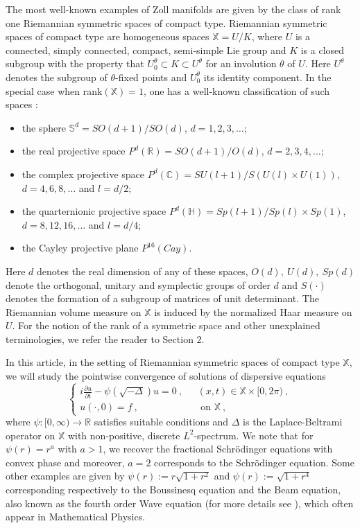 \documentclass[12pt]{amsart}
\theoremstyle{definition}
\newcommand{\R}{\mathbb R}%
\newcommand{\C}{\mathbb C}%
\newcommand{\Sb}{\mathbb S}%
\newcommand{\X}{\mathbb X}%
\newcommand{\Hb}{\mathbb H}%
\numberwithin{equation}{section}
\begin{document}
The most well-known examples of Zoll manifolds are given by the class of rank one Riemannian symmetric spaces of compact type. Riemannian symmetric spaces of compact type are homogeneous spaces $\X=U/K$, where $U$ is a connected, simply connected, compact, semi-simple Lie group and $K$ is a closed subgroup with the property that $U^\theta_0 \subset K \subset U^\theta$ for an involution $\theta$ of $U$. Here $U^\theta$ denotes the subgroup of $\theta$-fixed points and $U^\theta_0$ its identity component. In the special case when rank$(\X)=1$, one has a well-known classification of such spaces \cite{Wang}: 
\begin{itemize}
\item the sphere $\Sb^d =SO(d+1)/SO(d)$, $d=1,2,3,\dots$;
\item the real projective space $P^d(\R)=SO(d+1)/O(d)$, $d=2,3,4,\dots$;
\item the complex projective space $P^d(\C)=SU(l+1)/S(U(l) \times U(1))$, $d=4,6,8,\dots$ and $l=d/2$;
\item the quarternionic projective space $P^d(\Hb)=Sp(l+1)/Sp(l) \times Sp(1)$, $d=8,12,16,\dots$ and $l=d/4$;
\item the Cayley projective plane $P^{16}(Cay)$.
\end{itemize}
Here $d$ denotes the real dimension of any of these spaces, $O(d),\:U(d),\:Sp(d)$ denote the orthogonal, unitary and symplectic groups of order $d$ and $S(\cdot)$ denotes the formation of a subgroup of matrices of unit determinant. The Riemannian volume measure on $\X$ is induced by the normalized Haar measure on $U$. For the notion of the rank of a symmetric space and other unexplained terminologies, we refer the reader to Section $2$.
 
\medskip
 
In this article, in the setting of Riemannian symmetric spaces of compact type $\X$, we will study the pointwise convergence of solutions of dispersive equations 
\begin{equation} \label{dispersive}
\begin{cases}
	 i\frac{\partial u}{\partial t} -\psi\left(\sqrt{-\Delta}\right) u=0\:,\:\:\:  &(x,t) \in \X \times [0,2\pi)\:, \\
	u(\cdot, 0)=f\:, &\text{ on } \X \:,
	\end{cases}
\end{equation}
where $\psi: [0,\infty) \to \R$ satisfies suitable conditions and $\Delta$ is the Laplace-Beltrami operator on $\X$ with non-positive, discrete $L^2$-spectrum. We note that for $\psi(r)=r^a$ with $a>1$, we recover the fractional Schr\"odinger equations with convex phase and moreover, $a=2$ corresponds to the Schr\"odinger equation. Some other examples are given by $\psi(r):= r \sqrt{1+r^2}$ and $\psi(r):= \sqrt{1+r^4}$ corresponding respectively to the Boussinesq equation and the Beam equation, also known as the fourth order Wave equation (for more details see \cite{FG,GPW}), which often appear in Mathematical Physics.
\end{document}
